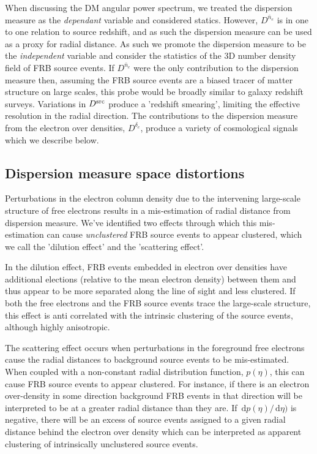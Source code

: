 \documentclass[onecolumn,prd,noshowpacs,nofootinbib,amsmath,amssymb]{revtex4}
\newcommand{\Dne}{D^{\bar{n}_e}}
\newcommand{\Dde}{D^{\delta_e}}
\newcommand{\Dsrc}{D^{\rm src}}
\newcommand{\ud}{\,\mathrm{d}}
\begin{document}
When discussing the DM angular power spectrum, we treated the dispersion
measure as the \emph{dependant} variable and considered statics. However,
$\Dne$ is in one to one relation to source redshift, and as such the dispersion
measure can be used as a proxy for radial distance.  As such we promote the
dispersion measure to be the \emph{independent} variable and consider the
statistics of the 3D number density field of FRB source events.
If $\Dne$ were the only contribution to the dispersion measure then, assuming
the FRB source events are a biased tracer of matter structure on large scales,
this probe would be broadly similar to galaxy redshift surveys.  Variations in
$\Dsrc$ produce a 'redshift smearing', limiting the effective resolution in the
radial direction. The contributions to the dispersion measure from the electron
over densities, $\Dde$, produce a variety of cosmological signals which we
describe below.


\subsection{Dispersion measure space distortions}

Perturbations in the electron column density due to the intervening large-scale
structure of free electrons results in a mis-estimation of radial distance
from dispersion measure.  We've identified two effects through which this
mis-estimation can cause \emph{unclustered} FRB source events to appear
clustered, which we call the 'dilution effect' and the 'scattering effect'.

In the dilution effect, FRB events embedded in electron over densities have
additional elections (relative to the mean electron density) between them and
thus appear to be more separated along the line of sight and less
clustered.  If both the free electrons and the FRB source events trace the
large-scale structure, this effect is anti correlated with the intrinsic
clustering of the source events, although highly anisotropic.

The scattering effect occurs when perturbations in the foreground free electrons
cause the radial distances to background source events to be mis-estimated. 
When coupled with a non-constant radial distribution
function, $p(\eta)$, this can cause FRB source events to
appear clustered. For instance, if there is an electron over-density in some
direction background FRB events in that direction will be interpreted to be at
a greater radial distance than they are. If $\ud p(\eta) /\ud \eta)$ is
negative, there will be an excess of source events assigned to a given radial
distance behind the electron over density which can be interpreted as apparent
clustering of intrinsically unclustered source events.
\end{document}

